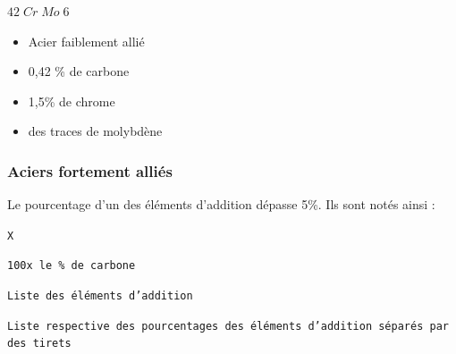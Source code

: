 \documentclass[11pt,oneside]{article}
\begin{document}
\begin{exemple}
\begin{minipage}[c]{.3\linewidth}
\begin{center}
$ 42\; Cr\; Mo\; 6$
\end{center}
\end{minipage} \hfill
\begin{minipage}[c]{.6\linewidth}
\begin{itemize}
\item Acier faiblement allié
\item 0,42 \% de carbone
\item 1,5\% de chrome 
\item des traces de molybdène
\end{itemize}
\end{minipage}
\end{exemple}


\subsubsection{Aciers fortement alliés}
\begin{resultat}
Le pourcentage d'un des éléments d'addition dépasse  5\%. Ils sont notés ainsi :


\begin{minipage}[c]{.1\linewidth}
\begin{center}
\texttt{X}
\end{center}
\end{minipage} \hfill
\begin{minipage}[c]{.2\linewidth}
\begin{center}
\texttt{100x le \% de carbone}
\end{center}
\end{minipage} \hfill
\begin{minipage}[c]{.2\linewidth}
\begin{center}
\texttt{Liste des éléments d'addition}
\end{center}
\end{minipage} \hfill
\begin{minipage}[c]{.3\linewidth}
\begin{center}
\texttt{Liste respective des pourcentages des éléments d'addition séparés par des tirets}
\end{center}
\end{minipage} 
\end{resultat}
\end{document}
